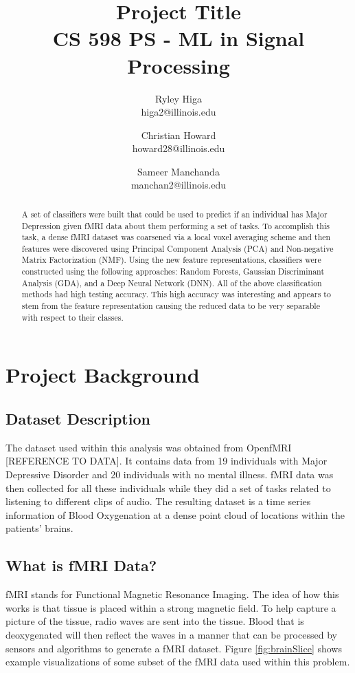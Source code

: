 \documentclass{article}[12pt]
\title{Project Title \\ CS 598 PS - ML in Signal Processing}
\author{
Ryley Higa \\ higa2@illinois.edu
\and 
Christian Howard \\ howard28@illinois.edu
\and
Sameer Manchanda \\ manchan2@illinois.edu
}
\date{} %
\begin{document}
   
   \maketitle
   \begin{abstract}
   A set of classifiers were built that could be used to predict if an individual has Major Depression given fMRI data about them performing a set of tasks. To accomplish this task, a dense fMRI dataset was coarsened via a local voxel averaging scheme and then features were discovered using Principal Component Analysis (PCA) and Non-negative Matrix Factorization (NMF). Using the new feature representations, classifiers were constructed using the following approaches: Random Forests, Gaussian Discriminant Analysis (GDA), and a Deep Neural Network (DNN). All of the above classification methods had high testing accuracy. This high accuracy was interesting and appears to stem from the feature representation causing the reduced data to be very separable with respect to their classes.
   \end{abstract}
   \newpage
   
   \tableofcontents
   \newpage
   
   \section{Project Background}
   \subsection{Dataset Description}
   The dataset used within this analysis was obtained from OpenfMRI [REFERENCE TO DATA]. It contains data from 19 individuals with Major Depressive Disorder and 20 individuals with no mental illness. fMRI data was then collected for all these individuals while they did a set of tasks related to listening to different clips of audio. The resulting dataset is a time series information of Blood Oxygenation at a dense point cloud of locations within the patients’ brains.
   
   \subsection{What is fMRI Data?}
   fMRI stands for Functional Magnetic Resonance Imaging. The idea of how this works is that tissue is placed within a strong magnetic field. To help capture a picture of the tissue, radio waves are sent into the tissue. Blood that is deoxygenated will then reflect the waves in a manner that can be processed by sensors and algorithms to generate a fMRI dataset. Figure \ref{fig:brainSlice} shows example visualizations of some subset of the fMRI data used within this problem.
   
\end{document}

